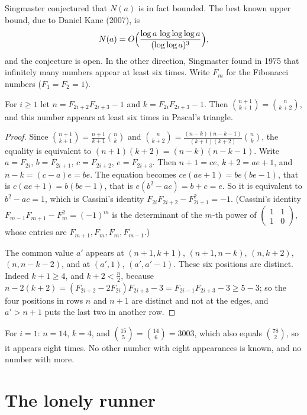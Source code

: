 Singmaster conjectured that $N(a)$ is in fact bounded. The best known upper bound, due to Daniel Kane (2007), is
\[
N(a)=O\Bigl(\frac{\log a\,\log\log\log a}{(\log\log a)^3}\Bigr),
\]
and the conjecture is open. In the other direction, Singmaster found in 1975 that infinitely many numbers appear at least six times. Write $F_m$ for the Fibonacci numbers ($F_1=F_2=1$).

\begin{proposition}[Singmaster, 1975]\label{prop:singmasterfamily}
For $i\ge1$ let $n=F_{2i+2}F_{2i+3}-1$ and $k=F_{2i}F_{2i+3}-1$. Then $\binom{n+1}{k+1}=\binom n{k+2}$, and this number appears at least six times in Pascal's triangle.
\end{proposition}

\begin{proof}
Since $\binom{n+1}{k+1}=\frac{n+1}{k+1}\binom nk$ and $\binom n{k+2}=\frac{(n-k)(n-k-1)}{(k+1)(k+2)}\binom nk$, the equality is equivalent to $(n+1)(k+2)=(n-k)(n-k-1)$. Write $a=F_{2i}$, $b=F_{2i+1}$, $c=F_{2i+2}$, $e=F_{2i+3}$. Then $n+1=ce$, $k+2=ae+1$, and $n-k=(c-a)e=be$. The equation becomes $ce(ae+1)=be(be-1)$, that is $c(ae+1)=b(be-1)$, that is $e(b^2-ac)=b+c=e$. So it is equivalent to $b^2-ac=1$, which is Cassini's identity $F_{2i}F_{2i+2}-F_{2i+1}^2=-1$. (Cassini's identity $F_{m-1}F_{m+1}-F_m^2=(-1)^m$ is the determinant of the $m$-th power of $\left(\begin{smallmatrix}1&1\\1&0\end{smallmatrix}\right)$, whose entries are $F_{m+1},F_m,F_m,F_{m-1}$.)

The common value $a'$ appears at $(n+1,k+1)$, $(n+1,n-k)$, $(n,k+2)$, $(n,n-k-2)$, and at $(a',1)$, $(a',a'-1)$. These six positions are distinct. Indeed $k+1\ge4$, and $k+2<\frac n2$, because $n-2(k+2)=(F_{2i+2}-2F_{2i})F_{2i+3}-3=F_{2i-1}F_{2i+3}-3\ge5-3$; so the four positions in rows $n$ and $n+1$ are distinct and not at the edges, and $a'>n+1$ puts the last two in another row.
\end{proof}

For $i=1$: $n=14$, $k=4$, and $\binom{15}5=\binom{14}6=3003$, which also equals $\binom{78}2$, so it appears eight times. No other number with eight appearances is known, and no number with more.

\section{The lonely runner}

